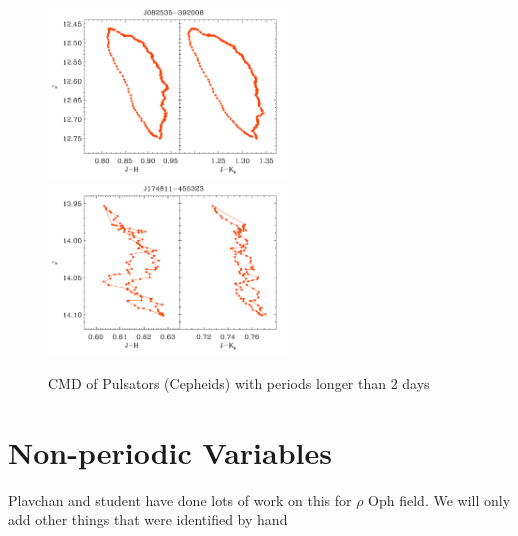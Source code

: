 \documentclass[]{emulateapj}
\begin{document}
\begin{figure}[]
\centering
\includegraphics[width=2.5in]{new_plots/rr_cmd_9}
\includegraphics[width=2.5in]{new_plots/rr_cmd_10}
\caption{CMD of Pulsators (Cepheids)  with periods longer than 2 days}
\label{cmdlong}
\end{figure}



\section{Non-periodic Variables}
Plavchan and student have done lots of work on this for $\rho$ Oph field. We will only add other things that were identified by hand



\end{document}
